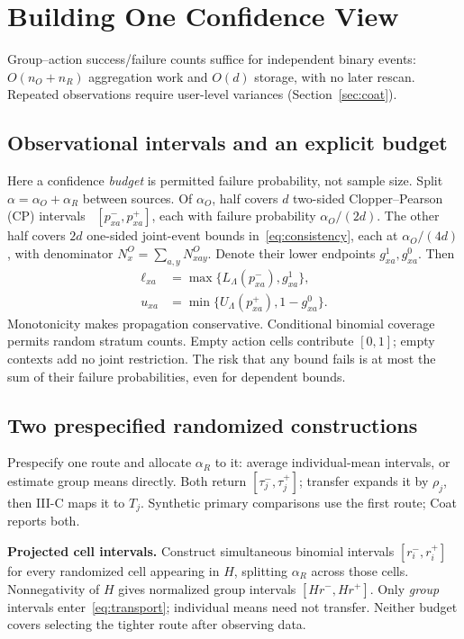 \documentclass[conference]{IEEEtran}
\begin{document}
\section{Building One Confidence View}\label{sec:view}
Group--action success/failure counts suffice for independent binary events: $O(n_O+n_R)$ aggregation work and $O(d)$ storage, with no later rescan. Repeated observations require user-level variances (Section~\ref{sec:coat}).
\subsection{Observational intervals and an explicit budget}
Here a confidence \emph{budget} is permitted failure probability, not sample size. Split $\alpha=\alpha_O+\alpha_R$ between sources. Of $\alpha_O$, half covers $d$ two-sided Clopper--Pearson (CP) intervals~\cite{clopper1934binomial} $[p^-_{xa},p^+_{xa}]$, each with failure probability $\alpha_O/(2d)$. The other half covers $2d$ one-sided joint-event bounds in~\eqref{eq:consistency}, each at $\alpha_O/(4d)$, with denominator $N^O_x=\sum_{a,y}N^O_{xay}$. Denote their lower endpoints $g^1_{xa},g^0_{xa}$. Then
\begin{align}
 \ell_{xa}&=\max\{L_\Lambda(p^-_{xa}),g^1_{xa}\},\nonumber\\
 u_{xa}&=\min\{U_\Lambda(p^+_{xa}),1-g^0_{xa}\}.\label{eq:obox}
\end{align}
Monotonicity makes propagation conservative. Conditional binomial coverage permits random stratum counts. Empty action cells contribute $[0,1]$; empty contexts add no joint restriction. The risk that any bound fails is at most the sum of their failure probabilities, even for dependent bounds.

\subsection{Two prespecified randomized constructions}
Prespecify one route and allocate $\alpha_R$ to it: average individual-mean intervals, or estimate group means directly. Both return $[\tau_j^-,\tau_j^+]$; transfer expands it by $\rho_j$, then III-C maps it to $T_j$. Synthetic primary comparisons use the first route; Coat reports both.

\textbf{Projected cell intervals.} Construct simultaneous binomial intervals $[r^-_i,r^+_i]$ for every randomized cell appearing in $H$, splitting $\alpha_R$ across those cells. Nonnegativity of $H$ gives normalized group intervals $[Hr^-,Hr^+]$. Only \emph{group} intervals enter~\eqref{eq:transport}; individual means need not transfer. Neither budget covers selecting the tighter route after observing data.
\end{document}
